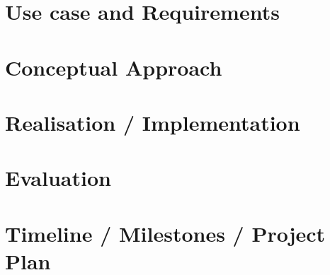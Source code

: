 \documentclass{article}
\begin{document}
\section{Use case and Requirements} %

\section{Conceptual Approach} %

\section{Realisation / Implementation} %


\section{Evaluation} %

\section{Timeline / Milestones / Project Plan} %

 

\end{document}

